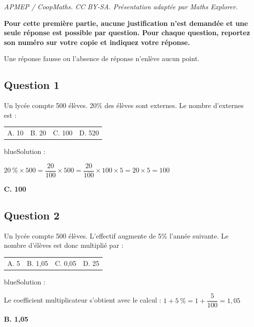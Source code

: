 \documentclass[10pt]{article}
\begin{document}
\noindent\textit{APMEP / CoopMaths. CC BY-SA. Présentation adaptée par Maths Explorer.}\par\medskip
\textbf{Pour cette première partie, aucune justification n'est demandée et une seule réponse est possible par question. Pour chaque question, reportez son numéro sur votre copie et indiquez votre réponse.}\par
Une réponse fausse ou l'absence de réponse n'enlève aucun point.

\vspace{.8em}

\subsection*{Question 1}

Un lycée compte 500 élèves. 20\% des élèves sont externes. Le nombre d'externes est :
\begin{center}
\begin{tabularx}{.92\linewidth}{XXXX} A. 10 & B. 20 & C. 100 & D. 520\end{tabularx}\end{center}

\begin{color}{blue}Solution :\par
$20~\%\times 500 = \dfrac{20}{100}\times 500 = \dfrac{20}{100}\times 100 \times 5 = 20 \times 5 = 100$

\textbf{C. 100}
\end{color}

\subsection*{Question 2}

Un lycée compte 500 élèves. L'effectif augmente de 5\% l'année suivante. Le nombre d'élèves est donc multiplié par :
\begin{center}
\begin{tabularx}{.92\linewidth}{XXXX} A. 5 & B. 1,05 & C. 0,05 & D. 25\end{tabularx}
\end{center}

\begin{color}{blue}Solution :\par

Le coefficient multiplicateur s'obtient avec le calcul : $1+5~\% = 1 + \dfrac{5}{100} = 1,05$

\textbf{B. 1,05}
\end{color}
\end{document}
